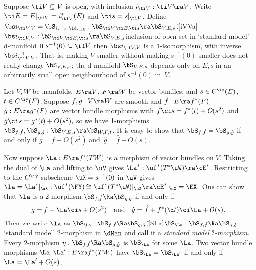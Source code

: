 \documentclass{article}
\begin{document}
\begin{ex}
Suppose $\ti V\subseteq V$ is open, with inclusion $i_{\smash{\ti
V}}:\ti V\ra V$. Write $\ti E=E\vert_{\ti V}= i_{\ti V}^*(E)$ and
$\ti s=s\vert_{\ti V}$. Define $\bs i_{\smash{\ti
V,V}}=\bS_{i_{\smash{\ti V}},\id_{\ti E}}:\bS_{\smash{\ti V,\ti
E,\ti s}}\ra\bS_{V,E,s}$.\G[iVVa]{$\bs i_{\smash{\ti
V,V}}:\bS_{\smash{\ti V,\ti E,\ti s}}\ra\bS_{V,E,s}$}{inclusion of
open set in `standard model' d-manifold} If $s^{-1}(0)\subseteq\ti
V$ then $\bs i_{\smash{\ti V,V}}$ is a 1-isomorphism, with inverse
$\bs i_{\smash{\ti V,V}}^{-1}$. That is, making $V$ smaller without
making $s^{-1}(0)$ smaller does not really change $\bS_{V,E,s}$; the
d-manifold $\bS_{V,E,s}$ depends only on $E,s$ in an arbitrarily
small open neighbourhood of $s^{-1}(0)$ in~$V$.

\label{ds4ex3}
\end{ex}

\begin{ex} Let $V,W$ be manifolds, $E\ra V$, $F\ra W$ be vector
bundles, and $s\in C^\iy(E)$, $t\in C^\iy(F)$. Suppose $f,g:V\ra W$
are smooth and $\hat f:E\ra f^*(F),$ $\hat g:E\ra g^*(F)$ are vector
bundle morphisms with $\hat f\ci s= f^*(t)+O(s^2)$ and $\hat g\ci s=
g^*(t)+O(s^2),$ so we have 1-morphisms $\bS_{\smash{f,\hat
f}},\bS_{\smash{g,\hat g}}:\bS_{V,E,s}\ra \bS_{W,F,t}$. It is easy
to show that $\bS_{\smash{f,\hat f}}=\bS_{\smash{g,\hat g}}$ if and
only if $g=f+O(s^2)$ and~$\hat g=\hat f+O(s)$.

Now suppose $\La:E\ra f^*(TW)$ is a morphism of vector bundles on
$V$. Taking the dual of $\La$ and lifting to $\uV$ gives
$\La^*:\uf^*(T^*\uW)\ra\cE^*$. Restricting to the $C^\iy$-subscheme
$\uX=s^{-1}(0)$ in $\uV$ gives $\la=\La^*\vert_\uX:
\uf^*(\FY)\cong\uf^*(T^*\uW) \vert_\uX\ra\cE^*\vert_\uX=\EX$. One
can show that $\la$ is a 2-morphism $\bS_{\smash{f,\hat
f}}\Ra\bS_{\smash{g,\hat g}}$ if and only if
\begin{equation*}
g= f+\La\ci s+O(s^2)\quad\text{and}\quad \hat g=\hat f+f^*(\d
t)\ci\La+O(s).
\end{equation*}
Then we write $\la$ as $\bS_\La:\bS_{\smash{f,\hat f}}\Ra\bS_{g,\hat
g}$,\G[SLa]{$\bS_\La:\bS_{\smash{f,\hat f}}\Ra\bS_{g,\hat
g}$}{`standard model' 2-morphism in $\dMan$} and call it a {\it
standard model\/ $2$-morphism}. Every 2-morphism $\eta:\bS_{\smash{f,\hat
f}}\Ra\bS_{\smash{g,\hat g}}$ is $\bS_\La$ for some $\La$. Two
vector bundle morphisms $\La,\La':E\ra f^*(TW)$ have
$\bS_\La=\bS_{\smash{\La'}}$ if and only if~$\La=\La'+O(s)$.
\label{ds4ex4}
\end{ex}
\end{document}
